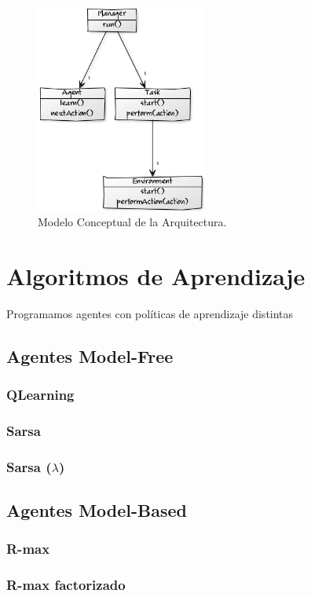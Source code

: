 \documentclass[a4paper,spanish] {article}
\begin{document}
	
	\begin{figure}[h!]
  \centering
    \includegraphics[width=0.5\textwidth]{MCarquitectra.png}
  \caption{Modelo Conceptual de la Arquitectura.}

	\end{figure}
\section{Algoritmos de Aprendizaje}
	Programamos agentes con pol\'iticas de aprendizaje distintas 
	\subsection{Agentes Model-Free}
		\subsubsection{QLearning}
		\subsubsection{Sarsa}
		\subsubsection{Sarsa ($\lambda$)}	
	\subsection{Agentes Model-Based}	
		\subsubsection{R-max}
		\subsubsection{R-max factorizado}
\end{document}
